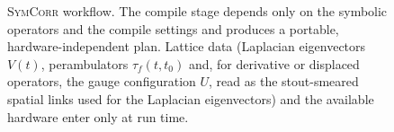 \documentclass[a4paper,fleqn]{cas-dc}
\begin{document}
\begin{figure}[pos=!hb]
{%
}
\caption{\textsc{SymCorr} workflow. The compile stage depends only on the symbolic
operators and the compile settings and produces a portable, hardware-independent plan.
Lattice data (Laplacian eigenvectors $V(t)$, perambulators $\tau_f(t,t_0)$ and, for
derivative or displaced operators, the gauge configuration $U$, read as the
stout-smeared spatial links used for the Laplacian eigenvectors) and the available
hardware enter only at run time.}
\label{fig:symcorr_workflow}
\end{figure}
\end{document}
